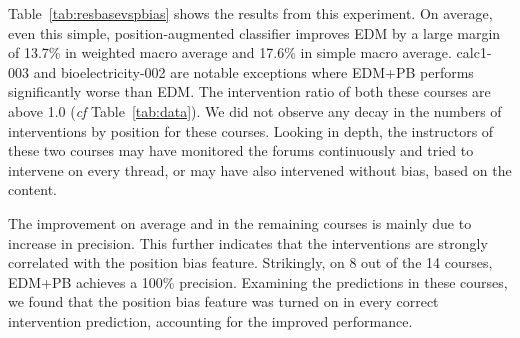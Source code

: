 \documentclass[11pt,a4paper]{article}
\begin{document}
Table~\ref{tab:resbasevspbias} shows the results from this
experiment. On average, even this simple, position-augmented
classifier improves EDM by a large margin of 13.7\% in weighted
macro average and 17.6\% in simple macro average. {\sc calc1-003} and
{\sc bioelectricity-002} are notable exceptions where EDM+PB performs
significantly worse than EDM. The intervention ratio of both these
courses are above 1.0 ({\it cf} Table~\ref{tab:data}). We did not
observe any decay in the numbers of interventions by position for
these courses. Looking in depth, the instructors of these two courses
may have monitored the forums continuously and tried to
intervene on every thread, or may
have also intervened without bias, based on the content.

The improvement on average and in the remaining courses is mainly due
to increase in precision. 
This further 
indicates that the interventions are strongly correlated with the 
position bias feature. Strikingly, on 8 out of the 14 courses, EDM+PB
achieves a 100\% precision. Examining the predictions in these
courses, we found that the position bias feature was turned on in
every correct intervention prediction, accounting for the improved
performance.
\end{document}
